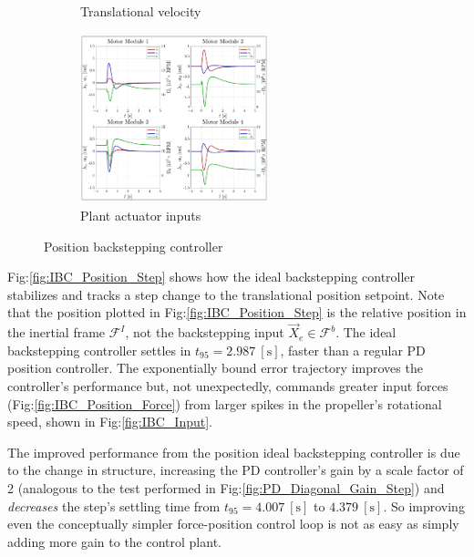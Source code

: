 \begin{figure}[htbp]
\begin{subfigure}{0.49\textwidth}
\vspace{-20pt}
\caption{Translational velocity}
\label{fig:IBC_Position_Velocity}
\end{subfigure}
\begin{subfigure}{\textwidth}
\centering
\includegraphics[width=0.6\textwidth]{graphs/IBC_Position_Input}
\vspace{-8pt}
\caption{Plant actuator inputs}
\label{fig:IBC_Position_Input}
\end{subfigure}
\vspace{-8pt}
\caption{Position backstepping controller}
\vspace{-20pt}
\end{figure}
\par
Fig:\ref{fig:IBC_Position_Step} shows how the ideal backstepping controller stabilizes and tracks a step change to the translational position setpoint. Note that the position plotted in Fig:\ref{fig:IBC_Position_Step} is the relative position in the inertial frame $\mathcal{F}^{I}$, not the backstepping input $\vec{X}_e\in\mathcal{F}^b$. The ideal backstepping controller settles in $t_{95}=2.987~[\text{s}]$, faster than a regular PD position controller. The exponentially bound error trajectory improves the controller's performance but, not unexpectedly, commands greater input forces (Fig:\ref{fig:IBC_Position_Force}) from larger spikes in the propeller's rotational speed, shown in Fig:\ref{fig:IBC_Input}. 
\par
The improved performance from the position ideal backstepping controller is due to the change in structure, increasing the PD controller's gain by a scale factor of 2 (analogous to the test performed in Fig:\ref{fig:PD_Diagonal_Gain_Step}) and \emph{decreases} the step's settling time from $t_{95}=4.007~[\text{s}]$ to $4.379~[\text{s}]$. So improving even the conceptually simpler force-position control loop is not as easy as simply adding more gain to the control plant. 

